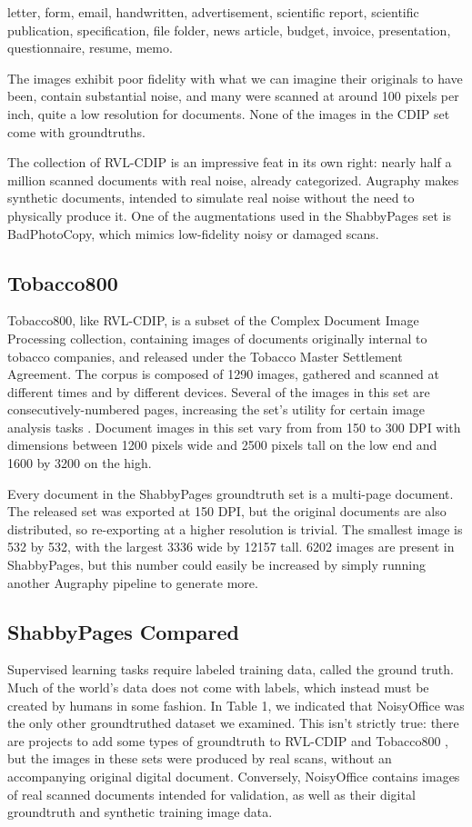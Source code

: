 \documentclass[runningheads]{llncs}
\begin{document}
\begin{center}
letter, form, email, handwritten, advertisement, scientific report,
scientific publication, specification, file folder, news article,
budget, invoice, presentation, questionnaire, resume, memo.
\end{center}

The images exhibit poor fidelity with what we can imagine their originals to have been, contain substantial noise, and many were scanned at around 100 pixels per inch, quite a low resolution for documents.
None of the images in the CDIP set come with groundtruths.

The collection of RVL-CDIP is an impressive feat in its own right: nearly half a million scanned documents with real noise, already categorized.
Augraphy makes synthetic documents, intended to simulate real noise without the need to physically produce it.
One of the augmentations used in the ShabbyPages set is BadPhotoCopy, which mimics low-fidelity noisy or damaged scans.

\subsection{Tobacco800}
Tobacco800, like RVL-CDIP, is a subset of the Complex Document Image Processing collection, containing images of documents originally internal to tobacco companies, and released under the Tobacco Master Settlement Agreement.
The corpus is composed of 1290 images, gathered and scanned at different times and by different devices.
Several of the images in this set are consecutively-numbered pages, increasing the set's utility for certain image analysis tasks \cite{ref_Tobacco800}.
Document images in this set vary from from 150 to 300 DPI with dimensions between 1200 pixels wide and 2500 pixels tall on the low end and 1600 by 3200 on the high.

Every document in the ShabbyPages groundtruth set is a multi-page document.
The released set was exported at 150 DPI, but the original documents are also distributed, so re-exporting at a higher resolution is trivial.
The smallest image is 532 by 532, with the largest 3336 wide by 12157 tall.
6202 images are present in ShabbyPages, but this number could easily be increased by simply running another Augraphy pipeline to generate more.

\subsection{ShabbyPages Compared}
Supervised learning tasks require labeled training data, called the ground truth.
Much of the world's data does not come with labels, which instead must be created by humans in some fashion.
In Table 1, we indicated that NoisyOffice was the only other groundtruthed dataset we examined.
This isn't strictly true: there are projects to add some types of groundtruth to RVL-CDIP \cite{ref_zenodo,ref_goldmann} and Tobacco800 \cite{ref_tobacco800gt2,ref_tobacco800gt1}, but the images in these sets were produced by real scans, without an accompanying original digital document.
Conversely, NoisyOffice contains images of real scanned documents intended for validation, as well as their digital groundtruth and synthetic training image data.
\end{document}
